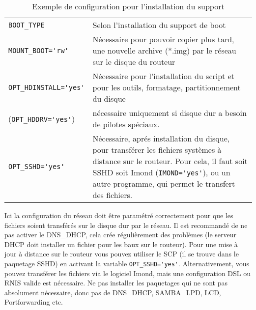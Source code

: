 \begin{table}[htb]
  \begin{center}
    \begin{small}
    \begin{tabular}[h!]{lp{9cm}}
    \verb*?BOOT_TYPE? & Selon l'installation du support de boot\\
    \verb*?MOUNT_BOOT='rw'? & Nécessaire pour pouvoir copier plus tard, une
        nouvelle archive (*.img) par le réseau sur le disque du routeur\\
    \verb*?OPT_HDINSTALL='yes'? & Nécessaire pour l'installation du script et
        pour les outils, formatage, partitionnement du disque\\
    (\verb*?OPT_HDDRV='yes'?) & nécessaire uniquement si disque dur a besoin de
        pilotes spéciaux.\\
    \verb*?OPT_SSHD='yes'? & Nécessaire, aprés installation du disque, pour
        transférer les fichiers systèmes à distance sur le routeur. Pour cela,
        il faut soit SSHD soit Imond (\verb*?IMOND='yes'?), ou un autre programme,
        qui permet le transfert des fichiers.
    \end{tabular}
    \end{small}
    \caption{Exemple de configuration pour l'installation du support}
  \end{center}
\end{table}

    Ici la configuration du réseau doit être paramétré correctement pour que les
    fichiers soient transférés sur le disque dur par le réseau. Il est recommandé
    de ne pas activer le DNS\_DHCP, cela crée régulièrement des problèmes 
    (le serveur DHCP doit installer un fichier pour les baux sur le routeur).
    Pour une mise à jour à distance sur le routeur vous pouvez utiliser le SCP
    (il se trouve dans le paquetage SSHD) en activant la variable
    \verb*?OPT_SSHD='yes'?. Alternativement, vous pouvez transférer les fichiers
    via le logiciel Imond, mais une configuration DSL ou RNIS valide est
    nécessaire. Ne pas installer les paquetages qui ne sont pas absolument
    nécessaire, donc pas de DNS\_DHCP, SAMBA\_LPD, LCD, Portforwarding etc.\\ 

